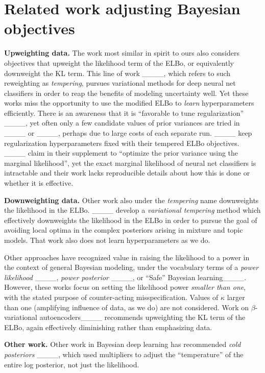 \section{Related work adjusting Bayesian objectives}
\label{sec:related_work}

\textbf{Upweighting data.}
The work most similar in spirit to ours also considers objectives that upweight the likelihood term of the ELBo, or equivalently downweight the KL term.
This line of work ____, which refers to such reweighting as \emph{tempering}, pursues variational methods for deep neural net classifiers in order to reap the benefits of modeling uncertainty well.  Yet these works miss the opportunity to use the modified ELBo to \emph{learn} hyperparameters efficiently. There is an awareness that it is ``favorable to tune regularization'' ____, yet often only a few candidate values of prior variances are tried in ____ or ____, perhaps due to large costs of each separate run.
____ keep regularization hyperparameters fixed with their tempered ELBo objectives. ____ claim in their supplement to ``optimize the prior variance using the marginal
likelihood'', yet the exact marginal likelihood of neural net classifiers is intractable and their work lacks reproducible details about how this is done or whether it is effective.

\textbf{Downweighting data.}
Other work also under the \emph{tempering} name downweights the likelihood in the ELBo.
____ develop a \emph{variational tempering} method which effectively downweights the likelihood in the ELBo in order to pursue the goal of avoiding local optima in the complex posteriors arising in mixture and topic models. That work also does not learn hyperparameters as we do.

Other approaches have recognized value in raising the likelihood to a power in the context of general Bayesian modeling, under the vocabulary terms of a \emph{power likelihood} ____, \emph{power posterior} ____, or ``Safe'' Bayesian learning____. 
However, these works focus on setting the likelihood power \emph{smaller than one}, with the stated purpose of counter-acting misspecification. Values of $\kappa$ larger than one (amplifying influence of data, as we do) are not considered. Work on $\beta$-variational autoencoders____ recommends upweighting the KL term of the ELBo, again effectively diminishing rather than emphasizing data.

\textbf{Other work.}
Other work in Bayesian deep learning has recommended \emph{cold posteriors} ____, which used multipliers to adjust the ``temperature'' of the entire log posterior, not just the likelihood.


